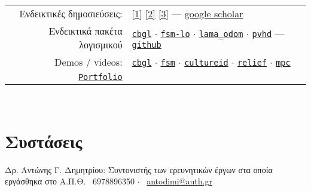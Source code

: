 \documentclass[a4paper,10pt,twoside]{article}
\begin{document}
\begin{tabular}{rp{12cm}}
  Ενδεικτικές δημοσιεύσεις: &
\href{https://ieeexplore.ieee.org/abstract/document/9981228}{[1]}
\href{https://www.sciencedirect.com/science/article/abs/pii/S0921889021002323}{[2]}
\href{https://www.tandfonline.com/doi/full/10.1080/00207179.2018.1514129}{[3]} --- \href{https://scholar.google.com/citations?view\_op=list\_works\&hl=en\&user=9\_hI4hMAAAAJ}{google scholar}\\

  Ενδεικτικά πακέτα λογισμικού&
\href{https://github.com/li9i/cbgl}{\texttt{cbgl}} $\cdot$
\href{https://github.com/li9i/fsm-lo}{\texttt{fsm-lo}} $\cdot$
\href{https://github.com/li9i/lama\_odom}{\texttt{lama\_odom}} $\cdot$
\href{https://github.com/li9i/pandora\_vision\_2014/tree/hydro-devel/pandora\_vision\_hole\_detector}{\texttt{pvhd}} --- \href{https://github.com/li9i}{\texttt{github}}\\

  Demos / videos: & \href{https://www.youtube.com/watch?v=xaDKjI0WkDc}{\texttt{cbgl}} $\cdot$ \href{https://www.youtube.com/watch?v=hB4qsHCEXGI}{\texttt{fsm}} $\cdot$ \href{https://cultureid.web.auth.gr/?page\_id=200&lang=en}{\texttt{cultureid}} $\cdot$ \href{https://relief.web.auth.gr/}{\texttt{relief}} $\cdot$ \href{https://www.youtube.com/watch?v=937OZez1iN8}{\texttt{mpc}}\\

  \href{https://raw.githubusercontent.com/li9i/portfolio/master/portfolio.pdf}{\texttt{Portfolio}} &
\end{tabular}
\\

\section{Συστάσεις}
\noindent Δρ. Αντώνης Γ. Δημητρίου: Συντονιστής των ερευνητικών έργων στα οποία εργάσθηκα στο Α.Π.Θ. \hspace{1cm}
\faPhone \ 6978896350 $\cdot$ \faEnvelopeO \ \href{mailto:antodimi@auth.gr}{antodimi@auth.gr} \\




\end{document}
